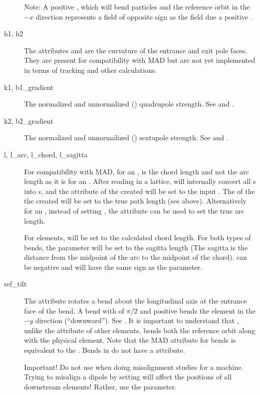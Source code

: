 \begin{description}
Note: A positive , which will bend particles and the reference orbit in the $-x$ direction
represents a field of opposite sign as the field due a positive .
  \item[h1, h2] \Newline
The attributes  and  are the curvature of the entrance and exit pole faces. They are
present for compatibility with MAD but are not yet implemented in terms of tracking and other
calculations.
  \item[k1, b1_gradient] \Newline
The normalized and unnormalized () quadrupole strength. See  and .

  \item[k2, b2_gradient] \Newline
The normalized and unnormalized () sextupole strength. See  and .
  \item[l, l_arc, l_chord, l_sagitta]  \Newline
For compatibility with MAD, for an ,  is the chord length and not the arc length as
it is for an .  After reading in a lattice, \bmad will internally convert all s
into s, and the  attribute of the created  will be set to the input
. The  of the the created  will be set to the true path length (see
above). Alternatively for an , instead of setting , the  attribute can be
used to set the true arc length. 

For  elements,  will be set to the calculated chord length. For both types of
bends, the  parameter will be set to the sagitta length (The sagitta is the distance
from the midpoint of the arc to the midpoint of the chord).  can be negative and will have
the same sign as the  parameter.
  \item[ref_tilt] \Newline
The  attribute rotates a bend about the longitudinal axis at the entrance face of the
bend. A bend with  of $\pi/2$ and positive  bends the element in the $-y$
direction (``downward''). See . It is important to understand that ,
unlike the  attribute of other elements, bends both the reference orbit along with the
physical element. Note that the MAD  attribute for bends is equivalent to the \bmad
{}. Bends in \bmad do not have a  attribute.

Important! Do not use  when doing misalignment studies for a machine. Trying to misalign
a dipole by setting  will affect the positions of all downstream elements! Rather, use the
 parameter.
  \end{description}

